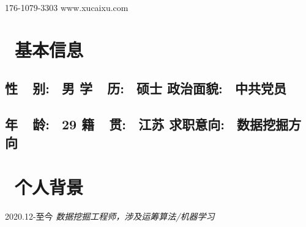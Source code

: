 \documentclass{resume}
\begin{document}











\medskip

    {176-1079-3303}    {www.xucaixu.com} 










\section{   \faListAlt  \  基本信息}
   \subsection{  \hspace{ 0.4cm }     \textbf{性\ \ 别}:    \ 男   
                        \hspace{ 3.2cm }     \textbf{学\ \ 历}:   \ 硕士 
                        \hspace{ 3.2cm }     \textbf{政治面貌}: \ 中共党员 }

   \subsection{  \hspace{ 0.4cm }     \textbf{年\ \ 龄}:     \ 29  
                        \hspace{ 3.2cm }     \textbf{籍\ \ 贯}:     \ 江苏 
                        \hspace{ 3.2cm }     \textbf{求职意向}:  \ 数据挖掘方向 }

\medskip











\section{   \faUser    \  个人背景}

                                                  {2020.12-至今}
   \faUserMd   \textit{   数据挖掘工程师，涉及运筹算法/机器学习 }
\end{document}
